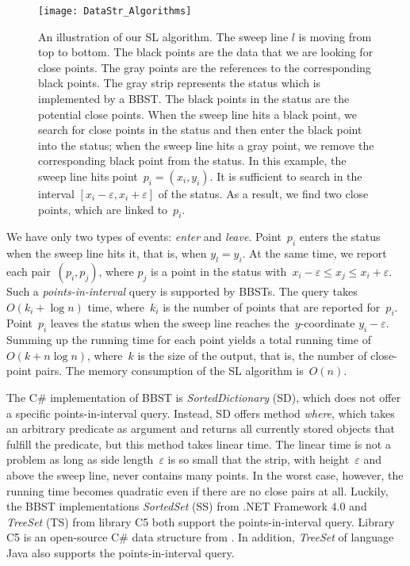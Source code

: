 \begin{figure}[tb]
	\centering
	\texttt{[image: DataStr\_Algorithms]}
	\caption{An illustration of our SL algorithm.
		The sweep line $l$ is moving from top to bottom.
		The black points are the data that 
		we are looking for close points.
		The gray points are the references 
		to the corresponding black points.
		The gray strip represents the status which is 
		implemented by a BBST.
		The black points in the status are the potential 
		close points.
		When the sweep line hits a black point,
		we search for close points in the status and then
		enter the black point into the status;
		when the sweep line hits a gray point, 
		we remove the corresponding black point from the status.
		In this example, the sweep line hits point~$p_i=(x_i, y_i)$. 
		It is sufficient to search in the interval
		$[x_i-\varepsilon, x_i+\varepsilon]$ of the status.
		As a result, we find two close points, 
		which are linked to~$p_i$.
}
	\label{fig:DataStr_SL}
\end{figure}

We have only two types of events: \emph{enter} and \emph{leave}.
Point~$p_{i} $ enters the status when the sweep line hits 
it, that is, when $y_{l}=y_{i}$. 
At the same time, we report each pair~$(p_{i},p_{j})$, where 
$p_{j}$ is a point in the status 
with~$x_{i}-\varepsilon \le x_{j}\le x_{i}+\varepsilon$. 
Such a \emph{points-in-interval} query is supported by BBSTs. 
The query takes~$O(k_{i}+\log n)$ time, 
where~$k_{i}$ is the number of points 
that are reported for~$p_{i}$.
Point~$p_{i}$ leaves the status 
when the sweep line reaches the~$y$-coordinate 
$y_{i}-\varepsilon$.
Summing up the running time for each point
yields a total running time of~$O(k+n\log n)$, 
where~$k$ is the size of the output, 
that is, the number of close-point pairs. 
The memory consumption of the SL algorithm is~$O(n)$.

The C\# implementation of BBST is \emph{SortedDictionary} (SD),
which does not offer a specific points-in-interval query. 
Instead, SD offers method \emph{where}, 
which takes an arbitrary predicate as argument 
and returns all currently stored objects 
that fulfill the predicate, but this method takes linear time. 
The linear time is not a problem 
as long as side length~$\varepsilon$ is so small 
that the strip, with height~$\varepsilon$ and above the sweep line, 
never contains many points. 
In the worst case, however, 
the running time becomes quadratic even 
if there are no close pairs at all. 
Luckily, the BBST implementations 
\emph{SortedSet} (SS) from .NET Framework 4.0 and
\emph{TreeSet} (TS) from library C5
both support the points-in-interval query.
Library C5 is an open-source C\# data structure
from \textcite{Kokholm2006}.
In addition, \emph{TreeSet} of language Java 
also supports the points-in-interval query.



